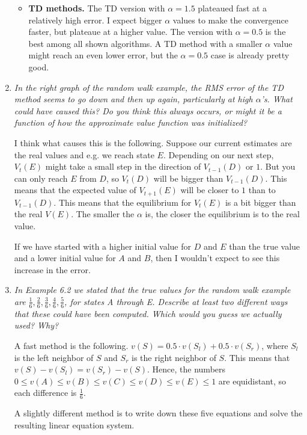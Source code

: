 \documentclass[12pt,a4paper]{article}
\begin{document}
\begin{enumerate}
\begin{itemize}
\item \textbf{TD methods.}
The TD version with $\alpha = 1.5$ plateaued fast at a relatively high error. I expect
bigger $\alpha$ values to make the convergence faster, but plateaue at a higher value.
The version with $\alpha = 0.5$ is the best among all shown algorithms. A TD method with a smaller
$\alpha$ value might reach an even lower error, but the $\alpha = 0.5$ case is already pretty good.
\end{itemize}

\item
\textit{In the right graph of the random walk example, the RMS error of the
TD method seems to go down and then up again, particularly at high $\alpha$’s. What could
have caused this? Do you think this always occurs, or might it be a function of how the
approximate value function was initialized?}

I think what causes this is the following. Suppose our current estimates are the real values and e.g.
we reach state $E$. Depending on our next step, $V_t(E)$ might take a small step in
the direction of $V_{t - 1}(D)$ or $1$. But you can only reach $E$ from $D$,
so $V_t(D)$ will be bigger than $V_{t - 1}(D)$. This means that the expected value
of $V_{t + 1}(E)$ will be closer to $1$ than to $V_{t - 1}(D)$. This means that the
equilibrium for $V_t(E)$ is a bit bigger than the real $V(E)$. The smaller
the $\alpha$ is, the closer the equilibrium is to the real value.

If we have started with a higher initial value for $D$ and $E$ than the true value
and a lower initial value for $A$ and $B$, then I wouldn't expect to see this increase
in the error.

\item
\textit{In Example 6.2 we stated that the true values for the random walk example are
$\frac{1}{6}, \frac{2}{6}, \frac{3}{6}, \frac{4}{6}, \frac{5}{6}$, for states A through E.
Describe at least two different ways that these could have been computed. Which would
you guess we actually used? Why?}

A fast method is the following. $v(S) = 0.5 \cdot v(S_l) + 0.5 \cdot v(S_r)$, where $S_l$ is the
left neighbor of $S$ and $S_r$ is the right neighbor of $S$. This means that $v(S) - v(S_l) = v(S_r) - v(S)$. Hence, the numbers $0 \le v(A) \le v(B) \le v(C) \le v(D) \le v(E) \le 1$ are equidistant, so
each difference is $\frac{1}{6}$.

A slightly different method is to write down these five equations and solve the resulting
linear equation system.
\end{enumerate}
\end{document}
